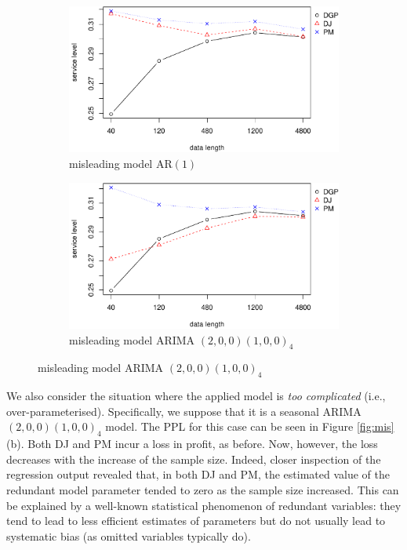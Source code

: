 \documentclass{article}
\begin{document}
\begin{figure}
\centering
\caption{Service level vs. data size in misleading model}
\begin{subfigure}[b]{0.48\textwidth}
\centering
\includegraphics[width=\textwidth]{information-plot_files/figure-latex/AR(1)sl-1.pdf}
\caption{misleading model AR$(1)$}
\end{subfigure}
\hfill
\begin{subfigure}[b]{0.48\textwidth}
\centering
\includegraphics[width=\textwidth]{information-plot_files/figure-latex/SAR(3)(1)_4sl-1.pdf}
\caption{misleading model ARIMA $(2,0,0)(1,0,0)_4$}
\end{subfigure}
\label{fig:mis_sl}
\end{figure}

We also consider the situation where the applied model is \emph{too complicated} (i.e., over-parameterised). Specifically, we suppose that it is a seasonal ARIMA$(2,0,0)(1,0,0)_4$ model. The PPL for this case can be seen in Figure \ref{fig:mis} (b). Both DJ and PM incur a loss in profit, as before. Now, however, the loss decreases with the increase of the sample size. Indeed, closer inspection of the regression output revealed that, in both DJ and PM, the estimated value of the redundant model parameter tended to zero as the sample size increased. This can be explained by a well-known statistical phenomenon of redundant variables: they tend to lead to less efficient estimates of parameters but do not usually lead to systematic bias (as omitted variables typically do).
\end{document}
